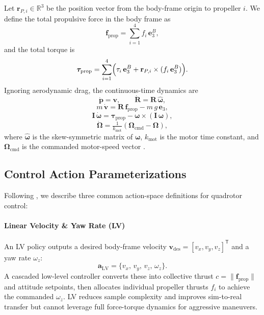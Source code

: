 Let \(\mathbf{r}_{P,i}\in \mathbb{R}^{3}\) be the position vector from the body-frame origin to propeller \(i\). We define the total propulsive force in the body frame as
\begin{equation}
\mathbf{f}_{\mathrm{prop}} = \sum_{i=1}^4 f_i\,\mathbf{e}_3^B,
\end{equation}
and the total torque is
\begin{equation}
\boldsymbol{\tau}_{\mathrm{prop}} = \sum_{i=1}^4 \Bigl(\tau_i\,\mathbf{e}_3^B + \mathbf{r}_{P,i}\times(f_i\,\mathbf{e}_3^B)\Bigr).
\end{equation}
Ignoring aerodynamic drag, the continuous-time dynamics are
\begin{equation}
\dot{\mathbf{p}} = \mathbf{v}, 
\qquad
\dot{\mathbf{R}} = \mathbf{R}\,\widehat{\boldsymbol{\omega}},
\end{equation}
\begin{equation}
m\,\dot{\mathbf{v}} = \mathbf{R}\,\mathbf{f}_{\mathrm{prop}} - m\,g\,\mathbf{e}_3,
\end{equation}
\begin{equation}
\mathbf{I}\,\dot{\boldsymbol{\omega}} = \boldsymbol{\tau}_{\mathrm{prop}} - \boldsymbol{\omega} \times (\mathbf{I}\,\boldsymbol{\omega}),
\end{equation}
\begin{equation}
\dot{\boldsymbol{\Omega}} = \tfrac{1}{k_{\mathrm{mot}}}(\boldsymbol{\Omega}_{\mathrm{cmd}} - \boldsymbol{\Omega}),
\end{equation}
where \(\widehat{\boldsymbol{\omega}}\) is the skew-symmetric matrix of \(\boldsymbol{\omega}\), \(k_{\mathrm{mot}}\) is the motor time constant, and \(\boldsymbol{\Omega}_{\mathrm{cmd}}\) is the commanded motor-speed vector \cite{kaufmann_benchmark_2022}.

\subsection{Control Action Parameterizations}
\label{sec:quadrotor_actions}
Following \cite{kaufmann_benchmark_2022}, we describe three common action-space definitions for quadrotor control:

\paragraph{Linear Velocity \& Yaw Rate (LV)}  
An LV policy outputs a desired body-frame velocity \(\mathbf{v}_{\mathrm{des}}=[v_x,v_y,v_z]^\mathsf{T}\) and a yaw rate \(\omega_z\):
\begin{equation}
\mathbf{a}_{\mathrm{LV}} = \{v_x,\,v_y,\,v_z,\,\omega_z\}.
\end{equation}
A cascaded low-level controller converts these into collective thrust \(c=\|\mathbf{f}_{\mathrm{prop}}\|\) and attitude setpoints, then allocates individual propeller thrusts \(f_i\) to achieve the commanded \(\omega_z\). LV reduces sample complexity and improves sim-to-real transfer but cannot leverage full force-torque dynamics for aggressive maneuvers.

